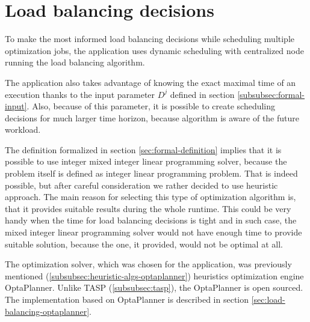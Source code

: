 \section{Load balancing decisions}\label{sec:load-balancing-decisions}

To make the most informed load balancing decisions while scheduling multiple optimization jobs,
the application uses dynamic scheduling with centralized node running the load balancing algorithm.

The application also takes advantage of knowing the exact maximal time of an execution thanks to the input parameter $D^{j}$ 
defined in section \ref{subsubsec:formal-input}.
Also,
because of this parameter, 
it is possible to create scheduling decisions for much larger time horizon, 
because algorithm is aware of the future workload.

The definition formalized in section \ref{sec:formal-definition} implies 
that it is possible to use integer mixed integer linear programming solver, 
because the problem itself is defined as integer linear programming problem.
That is indeed possible, 
but after careful consideration we rather decided to use heuristic approach.
The main reason for selecting this type of optimization algorithm is,
that it provides suitable results during the whole runtime.
This could be very handy when the time for load balancing decisions is tight
and in such case, the mixed integer linear programming solver would not have enough time to provide suitable solution,
because the one, it provided, would not be optimal at all.

The optimization solver, which was chosen for the application,
was previously mentioned (\ref{subsubsec:heuristic-algs-optaplanner}) heuristics optimization engine OptaPlanner.
Unlike TASP (\ref{subsubsec:tasp}), the OptaPlanner is open sourced.
The implementation based on OptaPlanner is described in section \ref{sec:load-balancing-optaplanner}.